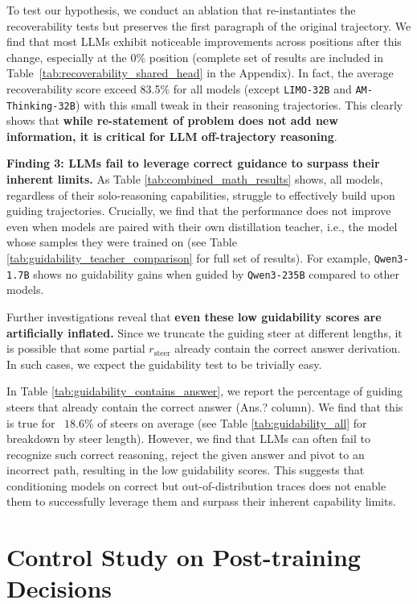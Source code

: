\documentclass{article} %
\providecommand{\DIFdelbegin}{} %
\providecommand{\DIFdelend}{} %
\newcommand{\DIFscaledelfig}{0.5}
\newlength{\DIFdelgraphicswidth} %
\newlength{\DIFdelgraphicsheight} %
\newcommand{\DIFdelincludegraphics}[2][]{%
\sbox{\DIFdelgraphicsbox}{\DIFOincludegraphics[#1]{#2}}%
\settoboxwidth{\DIFdelgraphicswidth}{\DIFdelgraphicsbox} %
\settoboxtotalheight{\DIFdelgraphicsheight}{\DIFdelgraphicsbox} %
\scalebox{\DIFscaledelfig}{%
\parbox[b]{\DIFdelgraphicswidth}{\usebox{\DIFdelgraphicsbox}\\[-\baselineskip] \rule{\DIFdelgraphicswidth}{0em}}\llap{\resizebox{\DIFdelgraphicswidth}{\DIFdelgraphicsheight}{%
\setlength{\unitlength}{\DIFdelgraphicswidth}%
\begin{picture}(1,1)%
\thicklines\linethickness{2pt} %
{\color[rgb]{1,0,0}\put(0,0){\framebox(1,1){}}}%
{\color[rgb]{1,0,0}\put(0,0){\line( 1,1){1}}}%
{\color[rgb]{1,0,0}\put(0,1){\line(1,-1){1}}}%
\end{picture}%
}\hspace*{3pt}}} %
} %
\DeclareRobustCommand{\DIFdelbegin}{\DIFOdelbegin \let\includegraphics\DIFdelincludegraphics} %
\DeclareRobustCommand{\DIFdelend}{\DIFOaddend \let\includegraphics\DIFOincludegraphics} %
\begin{document}
To test our hypothesis, we conduct an ablation that re-instantiates the recoverability tests but preserves the first paragraph of the original trajectory. We find that most LLMs exhibit noticeable improvements across positions after this change, especially at the 0\% position (complete set of results are included in Table~\ref{tab:recoverability_shared_head} in the Appendix). In fact, the average recoverability score exceed 83.5\%  for all models (except \texttt{LIMO-32B} and \texttt{AM-Thinking-32B}) with this small tweak in their reasoning trajectories. This clearly shows that \textbf{while re-statement of problem does not add new information, it is critical for LLM off-trajectory reasoning}. 


\textbf{Finding 3: LLMs fail to leverage correct guidance to surpass their inherent limits.} As Table \ref{tab:combined_math_results} shows, all models, regardless of their solo-reasoning capabilities, struggle to effectively build upon guiding trajectories. Crucially, we find that the performance does not improve even when models are paired with their own distillation teacher, i.e., the model whose samples they were trained on (see Table \ref{tab:guidability_teacher_comparison} for full set of results). For example, \texttt{Qwen3-1.7B} shows no guidability gains when guided by \texttt{Qwen3-235B} compared to other models.  

Further investigations reveal that \textbf{even these low guidability scores are artificially inflated.} Since we truncate the guiding steer at different lengths, it is possible that some partial $r_\mathrm{steer}$ already contain the correct answer derivation. In such cases, we expect the guidability test to be trivially easy. \DIFdelbegin %

\DIFdelend In Table \ref{tab:guidability_contains_answer}, we report the percentage of guiding steers that already contain the correct answer (Ans.? column). We find that this is true for ~$18.6$\% of steers on average (see Table \ref{tab:guidability_all} for breakdown by steer length). However, we find that LLMs can often fail to recognize such correct reasoning, reject the given answer and pivot to an incorrect path, resulting in the low guidability scores.  This suggests that conditioning models on correct but out-of-distribution traces does not enable them to successfully leverage them and surpass their inherent capability limits.

\section{Control Study on Post-training Decisions}
\label{sec:control_study}
\end{document}
